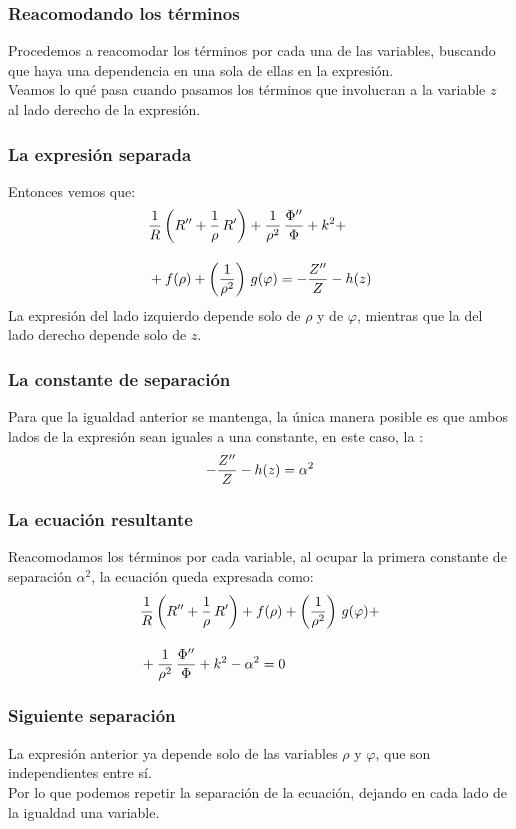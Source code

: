 \documentclass[12pt]{beamer}
\begin{document}
\begin{frame}
\frametitle{Reacomodando los términos}
Procedemos a reacomodar los términos por cada una de las variables, buscando que haya una dependencia en una sola de ellas en la expresión.
\\
\bigskip
\pause
Veamos lo qué pasa cuando pasamos los términos que involucran a la variable $z$ al lado derecho de la expresión.
\end{frame}
\begin{frame}
\frametitle{La expresión separada}
Entonces vemos que:
\pause
\begin{align*}
&{} \dfrac{1}{R} \left( {R}^{\prime \prime} + \dfrac{1}{\rho} \, {R}^{\prime} \right) + \dfrac{1}{\rho^{2}} \, \dfrac{{\Phi}^{\prime \prime}}{\Phi} + k^{2} + \\[1em]
&+ f(\rho) + \left( \dfrac{1}{\rho^{2}} \right) \, g(\varphi) = - \dfrac{{Z}^{\prime \prime}}{Z} - h(z)
\end{align*}
\pause
La expresión del lado izquierdo depende solo de $\rho$ y de $\varphi$, mientras que la del lado derecho depende solo de $z$.
\end{frame}
\begin{frame}
\frametitle{La constante de separación}
Para que la igualdad anterior se mantenga, la única manera posible es que ambos lados de la expresión sean iguales a una constante, en este caso, la :
\pause
\begin{align*}
- \dfrac{{Z}^{\prime \prime}}{Z} - h(z) = \alpha^{2}
\end{align*}
\end{frame}
\begin{frame}
\frametitle{La ecuación resultante}
Reacomodamos los términos por cada variable, al ocupar la primera constante de separación $\alpha^{2}$, la ecuación queda expresada como:
\pause
\begin{align*}
&{} \dfrac{1}{R} \left( {R}^{\prime \prime} + \dfrac{1}{\rho} \, {R}^{\prime} \right) +  f(\rho) + \left( \dfrac{1}{\rho^{2}} \right) \, g(\varphi) + \\[1em]
&+ \dfrac{1}{\rho^{2}} \, \dfrac{{\Phi}^{\prime \prime}}{\Phi} + k^{2} - \alpha^{2} = 0
\end{align*}
\end{frame}
\begin{frame}
\frametitle{Siguiente separación}
La expresión anterior ya depende solo de las variables $\rho$ y $\varphi$, que son independientes entre sí.
\\
\bigskip
\pause
Por lo que podemos repetir la separación de la ecuación, dejando en cada lado de la igualdad una variable.
\end{frame}
\end{document}
